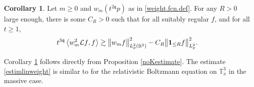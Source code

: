\documentclass[reqno]{amsart}
\newcommand{\pv}{p}
\def\norm#1{\big\Vert#1\big\Vert}
\newcommand{\irnp}[2]{\left\langle {#1},{#2} \right\rangle}
\newcommand{\threed}{{\mathbb R}^3}
\newcommand{\qq}{\mathfrak{q}}
\newcommand{\tqq}{t^{2\qq}}
\newcommand{\tTq}{t^{3\qq}}
\newcommand{\linL}{\mathcal{L}}
\newcommand{\ind}{{\bf 1}}
\newcommand{\T}{\mathbb{T}}
\theoremstyle{definition}
\newtheorem{corollary}[theorem]{Corollary}
\numberwithin{equation}{section}
\numberwithin{theorem}{section}
\begin{document}
\begin{corollary}
	\label{2.10} 
	Let $m\ge 0$ and $w_{m}(\tqq \pv)$ as in \eqref{weight.fcn.def}. For any $R>0$ large enough, there is some $C_R>0$ such that for all suitably regular \(f\), and for all \(t\geq 1\),
\begin{equation}\label{estimlinweight}
	     \tTq \irnp{ w_{m}^2\linL f}{f} \gtrsim \norm{w_{m} f}^2_{L^2_p(\threed)}-C_R\norm{\ind_{\le R}f}^2_{L^2_p}. 
	 \end{equation}
\end{corollary}

Corollary \ref{2.10} follows directly from Proposition \ref{noKestimate}. The estimate \eqref{estimlinweight} is similar to \cite[Section 2.6, Lemma 2.9]{RelBolNoncut2020} for the relativistic Boltzmann equation on \(\T^3_x\) in the massive case.
\end{document}
